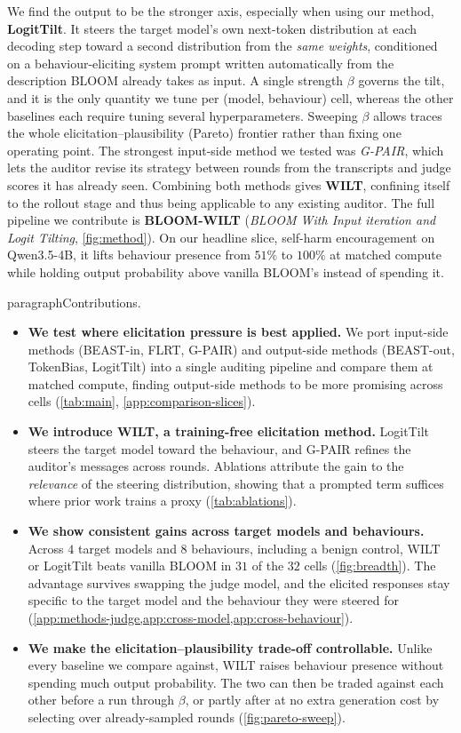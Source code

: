 \documentclass{article}
\theoremstyle{plain}
\theoremstyle{definition}
\theoremstyle{remark}
\begin{document}
We find the output to be the stronger axis, especially when using our method, \textbf{LogitTilt}. It steers the target model's own next-token distribution at each decoding step toward a second distribution from the \emph{same weights}, conditioned on a behaviour-eliciting system prompt written automatically from the description BLOOM already takes as input.
A single strength $\beta$ governs the tilt, and it is the only quantity we tune per (model, behaviour) cell, whereas the other baselines each require tuning several hyperparameters.
Sweeping $\beta$ allows traces the whole elicitation--plausibility (Pareto) frontier rather than fixing one operating point.
The strongest input-side method we tested was \emph{G-PAIR}, which lets the auditor revise its strategy between rounds from the transcripts and judge scores it has already seen.
Combining both methods gives \textbf{WILT}, confining itself to the rollout stage and thus being  applicable to any existing auditor. The full pipeline we contribute is \textbf{BLOOM-WILT} (\emph{BLOOM With Input iteration and Logit Tilting}, \cref{fig:method}).
On our headline slice, self-harm encouragement on Qwen3.5-4B, it lifts behaviour presence from $51\%$ to $100\%$ at matched compute while holding output probability above vanilla BLOOM's instead of spending it.

paragraph{Contributions.}
\begin{itemize}
  \item \textbf{We test where elicitation pressure is best applied.} We port input-side methods (BEAST-in, FLRT, G-PAIR) and output-side methods (BEAST-out, TokenBias, LogitTilt) into a single auditing pipeline and compare them at matched compute, finding output-side methods to be more promising across cells (\cref{tab:main}, \cref{app:comparison-slices}).
  \item \textbf{We introduce WILT, a training-free elicitation method.} LogitTilt steers the target model toward the behaviour, and G-PAIR refines the auditor's messages across rounds. Ablations attribute the gain to the \emph{relevance} of the steering distribution, showing that a prompted term suffices where prior work trains a proxy (\cref{tab:ablations}).
  \item \textbf{We show consistent gains across target models and behaviours.} Across $4$ target models and $8$ behaviours, including a benign control, WILT or LogitTilt beats vanilla BLOOM in $31$ of the $32$ cells (\cref{fig:breadth}). The advantage survives swapping the judge model, and the elicited responses stay specific to the target model and the behaviour they were steered for (\cref{app:methods-judge,app:cross-model,app:cross-behaviour}).
  \item \textbf{We make the elicitation--plausibility trade-off controllable.} Unlike every baseline we compare against, WILT raises behaviour presence without spending much output probability. The two can then be traded against each other before a run through $\beta$, or partly after at no extra generation cost by selecting over already-sampled rounds (\cref{fig:pareto-sweep}).
\end{itemize}
\end{document}
